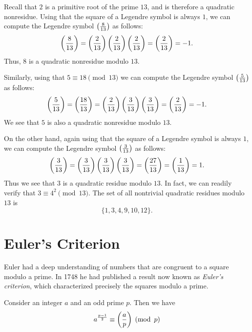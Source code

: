 \begin{example}
  Recall that $2$ is a primitive root of the prime $13$, and is therefore a quadratic nonresidue. Using that the square of a Legendre symbol is always $1$, we can compute the Legendre symbol $\legendre{8}{13}$ as follows:
  \begin{equation*}
    \legendre{8}{13}=\legendre{2}{13}\legendre{2}{13}\legendre{2}{13}=\legendre{2}{13}=-1.
  \end{equation*}
  Thus, $8$ is a quadratic nonresidue modulo $13$.

  Similarly, using that $5\equiv 18\pmod{13}$ we can compute the Legendre symbol $\legendre{5}{13}$ as follows:
  \begin{equation*}
    \legendre{5}{13}=\legendre{18}{13}=\legendre{2}{13}\legendre{3}{13}\legendre{3}{13}=\legendre{2}{13}=-1.
  \end{equation*}
  We see that $5$ is also a quadratic nonresidue modulo $13$.

  On the other hand, again using that the square of a Legendre symbol is always $1$, we can compute the Legendre symbol $\legendre{3}{13}$ as follows:
  \begin{equation*}
    \legendre{3}{13}=\legendre{3}{13}\legendre{3}{13}\legendre{3}{13}=\legendre{27}{13}=\legendre{1}{13}=1.
  \end{equation*}
  Thus we see that $3$ is a quadratic residue modulo $13$. In fact, we can readily verify that $3\equiv 4^2\pmod{13}$. The set of all nontrivial quadratic residues modulo $13$ is
  \begin{equation*}
    \{1,3,4,9,10,12\}.
  \end{equation*}
\end{example}

\section{Euler's Criterion}

Euler had a deep understanding of numbers that are congruent to a square modulo a prime. In 1748 he had published a result now known as \emph{Euler's criterion}, which characterized precisely the squares modulo a prime.

\begin{theorem}\label{theorem:eulers-criterion}
  Consider an integer $a$ and an odd prime $p$. Then we have
  \begin{equation*}
    a^{\frac{p-1}{2}} \equiv \legendre{a}{p}\pmod{p}
  \end{equation*}
\end{theorem}

